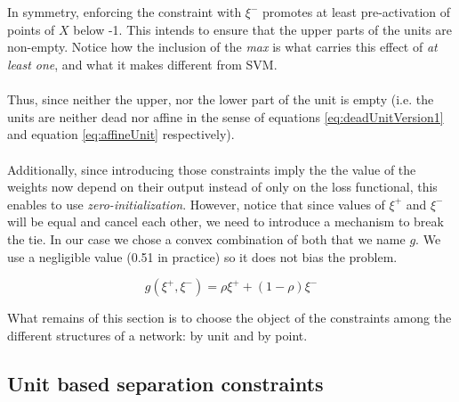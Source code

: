 \\\\
In symmetry, enforcing the constraint with $\xi^{-}$ promotes at least pre-activation of points of $X$ below -1. This intends to ensure that the upper parts of the units are non-empty. Notice how the inclusion of the \emph{max} is what carries this effect of \emph{at least one}, and what it makes different from SVM.
\\\\
Thus, since neither the upper, nor the lower part of the unit is empty (i.e. the units are neither dead nor affine in the sense of equations \ref{eq:deadUnitVersion1} and equation \ref{eq:affineUnit} respectively).
\\\\
Additionally, since introducing those constraints imply the the value of the weights now depend on their output instead of only on the loss functional, this enables to use \emph{zero-initialization}. However, notice that since values of $\xi^+$ and $\xi^-$ will be equal and cancel each other, we need to introduce a mechanism to break the tie. In our case we chose a convex combination of both that we name $g$. We use a negligible value (0.51 in practice) so it does not bias the problem.

\begin{equation}\label{eq:definitionOfRho}
    g(\xi^{+},\xi^{-}) = \rho\xi^{+}+(1-\rho)\xi^{-}
\end{equation}

What remains of this section is to choose the object of the constraints among the different structures of a network: by unit and by point.

\subsection{Unit based separation constraints \SepUnit}\label{subsec:sepUnit}

